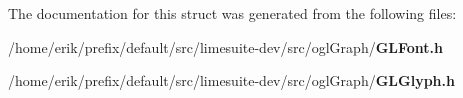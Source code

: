 The documentation for this struct was generated from the following files\+:\begin{DoxyCompactItemize}
\item 
/home/erik/prefix/default/src/limesuite-\/dev/src/ogl\+Graph/{\bf G\+L\+Font.\+h}\item 
/home/erik/prefix/default/src/limesuite-\/dev/src/ogl\+Graph/{\bf G\+L\+Glyph.\+h}\end{DoxyCompactItemize}
